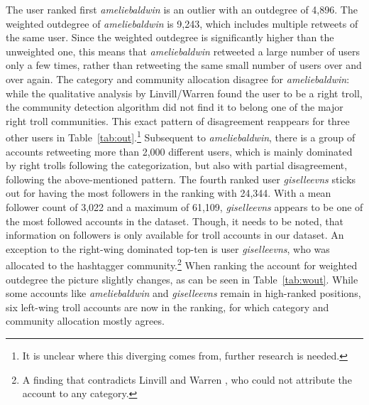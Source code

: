 \documentclass[12pt, titlepage=true, toc=bib]{scrartcl}
\begin{document}
The user ranked first \textit{ameliebaldwin} is an outlier with an outdegree of 4,896. The weighted outdegree of \textit{ameliebaldwin} is 9,243, which includes multiple retweets of the same user. Since the weighted outdegree is significantly higher than the unweighted one, this means that \textit{ameliebaldwin} retweeted a large number of users only a few times, rather than retweeting the same small number of users over and over again. The category and community allocation disagree for \textit{ameliebaldwin}: while the qualitative analysis by Linvill/Warren found the user to be a right troll, the community detection algorithm did not find it to belong one of the major right troll communities. This exact pattern of disagreement reappears for three other users in Table~\ref{tab:out}.\footnote{It is unclear where this diverging comes from, further research is needed.} Subsequent to \textit{ameliebaldwin}, there is a group of accounts retweeting more than 2,000 different users, which is mainly dominated by right trolls following the categorization, but also with partial disagreement, following the above-mentioned pattern. The fourth ranked user \textit{giselleevns} sticks out for having the most followers in the ranking with 24,344. With a mean follower count of 3,022 and a maximum of 61,109, \textit{giselleevns} appears to be one of the most followed accounts in the dataset. Though, it needs to be noted, that information on followers is only available for troll accounts in our dataset. An exception to the right-wing dominated top-ten is user \textit{giselleevns}, who was allocated to the hashtagger community.\footnote{A finding that contradicts Linvill and Warren \cite*{linvill_troll_2018}, who could not attribute the account to any category.} When ranking the account for weighted outdegree the picture slightly changes, as can be seen in Table~\ref{tab:wout}. While some accounts like \textit{ameliebaldwin} and \textit{giselleevns} remain in high-ranked positions, six left-wing troll accounts are now in the ranking, for which category and community allocation mostly agrees.
\end{document}
